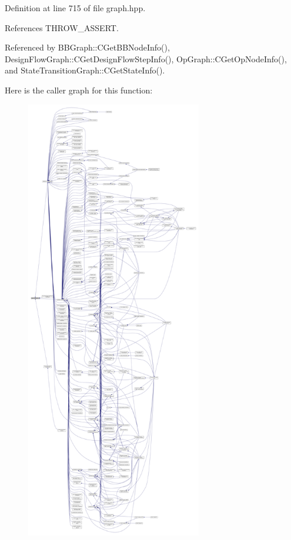 Definition at line 715 of file graph.\+hpp.



References T\+H\+R\+O\+W\+\_\+\+A\+S\+S\+E\+RT.



Referenced by B\+B\+Graph\+::\+C\+Get\+B\+B\+Node\+Info(), Design\+Flow\+Graph\+::\+C\+Get\+Design\+Flow\+Step\+Info(), Op\+Graph\+::\+C\+Get\+Op\+Node\+Info(), and State\+Transition\+Graph\+::\+C\+Get\+State\+Info().

Here is the caller graph for this function\+:
\nopagebreak
\begin{figure}[H]
\begin{center}
\leavevmode
\includegraphics[height=550pt]{d5/d15/structgraph_a6dfc893ca9b8dfcad31c8b2267f0b160_icgraph}
\end{center}
\end{figure}
\mbox{\label{structgraph_aff86ad7c5fb14a29be2013610985ef8e}} 
